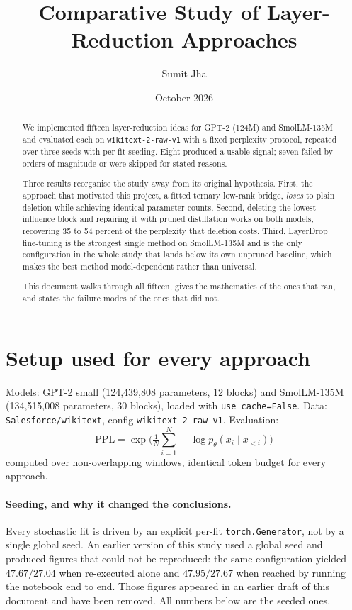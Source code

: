 \documentclass[11pt]{article}
\title{Comparative Study of Layer-Reduction Approaches}
\author{Sumit Jha}
\date{October 2026}
\begin{document}
\maketitle

\begin{abstract}
We implemented fifteen layer-reduction ideas for GPT-2 (124M) and
SmolLM-135M and evaluated each on \texttt{wikitext-2-raw-v1} with a fixed
perplexity protocol, repeated over three seeds with per-fit seeding. Eight
produced a usable signal; seven failed by orders of magnitude or were
skipped for stated reasons.

Three results reorganise the study away from its original hypothesis. First,
the approach that motivated this project, a fitted ternary low-rank bridge,
\emph{loses} to plain deletion while achieving identical parameter counts.
Second, deleting the lowest-influence block and repairing it with pruned
distillation works on both models, recovering 35 to 54 percent of the
perplexity that deletion costs. Third, LayerDrop fine-tuning is the strongest
single method on SmolLM-135M and is the only configuration in the whole study
that lands below its own unpruned baseline, which makes the best method
model-dependent rather than universal.

This document walks through all fifteen, gives the mathematics of the ones
that ran, and states the failure modes of the ones that did not.
\end{abstract}

\section{Setup used for every approach}
Models: GPT-2 small (124,439,808 parameters, 12 blocks) and SmolLM-135M
(134,515,008 parameters, 30 blocks), loaded with \texttt{use\_cache=False}.
Data: \texttt{Salesforce/wikitext}, config \texttt{wikitext-2-raw-v1}.
Evaluation:
\[
\mathrm{PPL}=\exp\!\Big(\tfrac{1}{N}\sum_{i=1}^{N} -\log
p_\theta(x_i \mid x_{<i})\Big)
\]
computed over non-overlapping windows, identical token budget for every
approach.

\paragraph{Seeding, and why it changed the conclusions.} Every stochastic fit
is driven by an explicit per-fit \texttt{torch.Generator}, not by a single
global seed. An earlier version of this study used a global seed and produced
figures that could not be reproduced: the same configuration yielded
$47.67/27.04$ when re-executed alone and $47.95/27.67$ when reached by running
the notebook end to end. Those figures appeared in an earlier draft of this
document and have been removed. All numbers below are the seeded ones.
\end{document}

